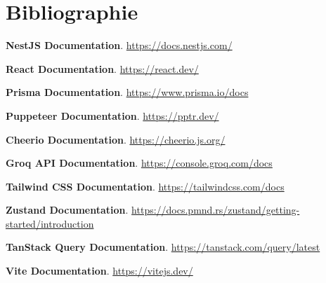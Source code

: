 \documentclass[12pt,a4paper]{report}
\begin{document}
\chapter*{Bibliographie}

\vspace*{0.5cm}

\begin{enumerate}[label={[\arabic*]}]
  \item \textbf{NestJS Documentation}. \url{https://docs.nestjs.com/}
  \item \textbf{React Documentation}. \url{https://react.dev/}
  \item \textbf{Prisma Documentation}. \url{https://www.prisma.io/docs}
  \item \textbf{Puppeteer Documentation}. \url{https://pptr.dev/}
  \item \textbf{Cheerio Documentation}. \url{https://cheerio.js.org/}
  \item \textbf{Groq API Documentation}. \url{https://console.groq.com/docs}
  \item \textbf{Tailwind CSS Documentation}. \url{https://tailwindcss.com/docs}
  \item \textbf{Zustand Documentation}. \url{https://docs.pmnd.rs/zustand/getting-started/introduction}
  \item \textbf{TanStack Query Documentation}. \url{https://tanstack.com/query/latest}
  \item \textbf{Vite Documentation}. \url{https://vitejs.dev/}
\end{enumerate}
\end{document}
